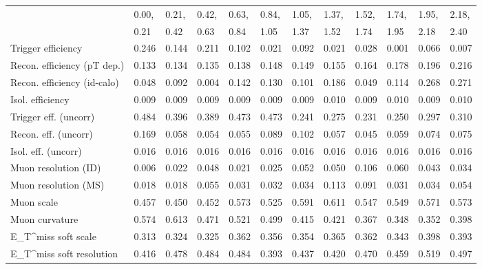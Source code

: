 \begin{tabular}{l|p{0.6cm}p{0.6cm}p{0.6cm}p{0.6cm}p{0.6cm}p{0.6cm}p{0.6cm}p{0.6cm}p{0.6cm}p{0.6cm}p{0.6cm}}
\hline
   & 0.00, & 0.21, & 0.42, & 0.63, & 0.84, & 1.05, & 1.37, & 1.52, & 1.74, & 1.95, & 2.18,  \\ 
   & 0.21 & 0.42 & 0.63 & 0.84 & 1.05 & 1.37 & 1.52 & 1.74 & 1.95 & 2.18 & 2.40  \\ 
\hline
Trigger efficiency                       & 0.246 & 0.144 & 0.211 & 0.102 & 0.021 & 0.092 & 0.021 & 0.028 & 0.001 & 0.066 & 0.007 \\
Recon. efficiency (pT dep.)              & 0.133 & 0.134 & 0.135 & 0.138 & 0.148 & 0.149 & 0.155 & 0.164 & 0.178 & 0.196 & 0.216 \\
Recon. efficiency (id-calo)              & 0.048 & 0.092 & 0.004 & 0.142 & 0.130 & 0.101 & 0.186 & 0.049 & 0.114 & 0.268 & 0.271 \\
Isol. efficiency                         & 0.009 & 0.009 & 0.009 & 0.009 & 0.009 & 0.009 & 0.010 & 0.009 & 0.010 & 0.009 & 0.010 \\
Trigger eff. (uncorr)                    & 0.484 & 0.396 & 0.389 & 0.473 & 0.473 & 0.241 & 0.275 & 0.231 & 0.250 & 0.297 & 0.310 \\
Recon. eff. (uncorr)                     & 0.169 & 0.058 & 0.054 & 0.055 & 0.089 & 0.102 & 0.057 & 0.045 & 0.059 & 0.074 & 0.075 \\
Isol. eff. (uncorr)                      & 0.016 & 0.016 & 0.016 & 0.016 & 0.016 & 0.016 & 0.016 & 0.016 & 0.016 & 0.016 & 0.016 \\
Muon resolution (ID)                     & 0.006 & 0.022 & 0.048 & 0.021 & 0.025 & 0.052 & 0.050 & 0.106 & 0.060 & 0.043 & 0.034 \\
Muon resolution (MS)                     & 0.018 & 0.018 & 0.055 & 0.031 & 0.032 & 0.034 & 0.113 & 0.091 & 0.031 & 0.034 & 0.054 \\
Muon scale                               & 0.457 & 0.450 & 0.452 & 0.573 & 0.525 & 0.591 & 0.611 & 0.547 & 0.549 & 0.571 & 0.573 \\
Muon curvature                           & 0.574 & 0.613 & 0.471 & 0.521 & 0.499 & 0.415 & 0.421 & 0.367 & 0.348 & 0.352 & 0.398 \\
E_{T}^{miss} soft scale                  & 0.313 & 0.324 & 0.325 & 0.362 & 0.356 & 0.354 & 0.365 & 0.362 & 0.343 & 0.398 & 0.393 \\
E_{T}^{miss} soft resolution             & 0.416 & 0.478 & 0.484 & 0.484 & 0.393 & 0.437 & 0.420 & 0.470 & 0.459 & 0.519 & 0.497 \\

\end{tabular}
